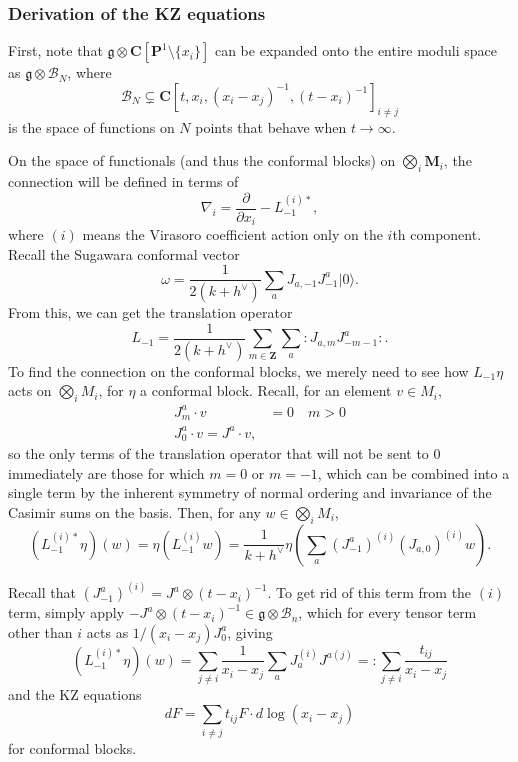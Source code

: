 \documentclass{article}
\newcommand{\CC}{\mathbold{C}}
\newcommand{\ZZ}{\mathbold{Z}}
\newcommand{\PP}{\mathbold{P}}
\newcommand{\MM}{\mathbold{M}}
\newcommand{\vac}{|0\rangle}
\newcommand{\Bb}{\mathcal{B}}
\newcommand{\gf}{\mathfrak{g}}
\newcommand{\normord}[1]{:\mathrel{#1}:}
\begin{document}
\subsubsection{Derivation of the KZ equations}
First, note that $\gf \otimes \CC[\PP^1 \setminus \{x_i\}]$ can be expanded onto the entire moduli space as $\gf \otimes \Bb_N$, where
\[\Bb_N \subsetneq \CC[t,x_i,(x_i-x_j)^{-1},(t-x_i)^{-1}]_{i \ne j} \]
is the space of functions on $N$ points that behave when $t \rightarrow \infty$.

On the space of functionals (and thus the conformal blocks) on $\bigotimes_i \MM_i$, the connection will be defined in terms of
\[\nabla_i = \frac{\partial}{\partial x_i} - L^{(i)*}_{-1}, \]
where $(i)$ means the Virasoro coefficient action only on the $i$th component.  Recall the Sugawara conformal vector
\[\omega = \frac{1}{2(k+h^\vee)} \sum_a J_{a,-1}J^a_{-1} \vac. \]
From this, we can get the translation operator
\[L_{-1} = \frac{1}{2(k+h^\vee)} \sum_{m \in \ZZ} \sum_a \normord{J_{a,m}J^a_{-m-1}}. \]
To find the connection on the conformal blocks, we merely need to see how $L_{-1}\eta$ acts on $\bigotimes_i M_i$, for $\eta$ a conformal block.  Recall, for an element $v \in M_i$,
\begin{align}
  J^a_m \cdot v&=0 \quad m>0\\
  J^a_0 \cdot v=J^a\cdot v,
\end{align}
so the only terms of the translation operator that will not be sent to $0$ immediately are those for which $m=0$ or $m=-1$, which can be combined into a single term by the inherent symmetry of normal ordering and invariance of the Casimir sums on the basis.
Then, for any $w \in \bigotimes_i M_i$,
\[(L^{(i)*}_{-1}\eta)(w)=\eta(L^{(i)}_{-1}w)=\frac{1}{k+h^\vee}\eta \left( \sum_a (J^a_{-1})^{(i)}(J_{a,0})^{(i)}w \right). \]

Recall that $(J^a_{-1})^{(i)}=J^a \otimes (t-x_i)^{-1}$.  To get rid of this term from the $(i)$ term, simply apply $-J^a \otimes (t-x_i)^{-1} \in \gf \otimes \Bb_n$, which for every tensor term other than $i$ acts as $1/(x_i-x_j)J^a_0$, giving
\[(L^{(i)*}_{-1}\eta)(w)=\sum_{j \ne i}\frac{1}{x_i-x_j} \sum_a J_a^{(i)}J^{a(j)} =: \sum_{j \ne i} \frac{t_{ij}}{x_i-x_j} \] 
and the KZ equations
\[dF = \sum_{i \ne j}t_{ij}F \cdot d\log(x_i-x_j) \]
for conformal blocks.  

{}

\end{document}

